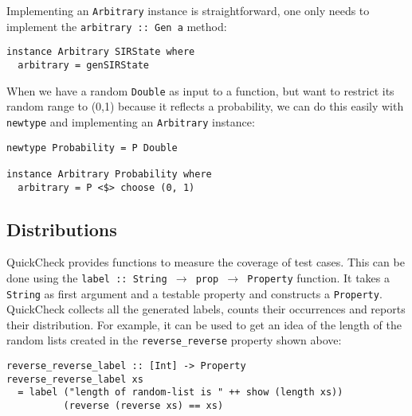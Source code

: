 Implementing an \texttt{Arbitrary} instance is straightforward, one only needs to implement the \texttt{arbitrary :: Gen a} method:

\begin{footnotesize}
\begin{verbatim}
instance Arbitrary SIRState where
  arbitrary = genSIRState
\end{verbatim}
\end{footnotesize}

When we have a random \texttt{Double} as input to a function, but want to restrict its random range to (0,1) because it reflects a probability, we can do this easily with \texttt{newtype} and implementing an \texttt{Arbitrary} instance:

\begin{footnotesize}
\begin{verbatim}
newtype Probability = P Double

instance Arbitrary Probability where
  arbitrary = P <$> choose (0, 1)
\end{verbatim}
\end{footnotesize}

\subsection{Distributions}
QuickCheck provides functions to measure the coverage of test cases. This can be done using the 
\texttt{label :: String $\rightarrow$ prop $\rightarrow$ Property} function. It takes a \texttt{String} as first argument and a testable property and constructs a \texttt{Property}. QuickCheck collects all the generated labels, counts their occurrences and reports their distribution. For example, it can be used to get an idea of the length of the random lists created in the \texttt{reverse\_reverse} property shown above:

\begin{footnotesize}
\begin{verbatim}
reverse_reverse_label :: [Int] -> Property
reverse_reverse_label xs  
  = label ("length of random-list is " ++ show (length xs)) 
          (reverse (reverse xs) == xs)
\end{verbatim}
\end{footnotesize}


